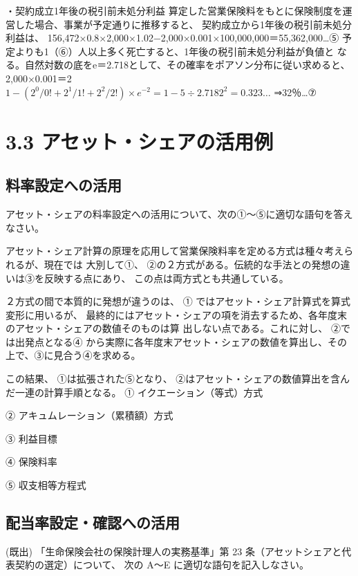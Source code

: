 \documentclass[report,gutter=10mm,fore-edge=10mm,uplatex,dvipdfmx]{jlreq}
\begin{document}
・契約成立1年後の税引前未処分利益
算定した営業保険料をもとに保険制度を運営した場合、事業が予定通りに推移すると、
契約成立から1年後の税引前未処分利益は、
156,472×0.8×2,000×1.02−2,000×0.001×100,000,000＝55,362,000…⑤
予定よりも1（⑥）人以上多く死亡すると、1年後の税引前未処分利益が負値と
なる。自然対数の底をe＝2.718として、その確率をポアソン分布に従い求めると、\\
2,000×0.001＝2\\
$1-(2^0/0!+2^1/1!+2^2/2!)×e^{−2}=1−5\div2.7182^2=0.323…$
⇒32％…⑦
\section{3.3 アセット・シェアの活用例}
\subsection{料率設定への活用}
アセット・シェアの料率設定への活用について、次の①～⑤に適切な語句を答えなさい。

アセット・シェア計算の原理を応用して営業保険料率を定める方式は種々考えられるが、現在では
大別して①、 ②の２方式がある。伝統的な手法との発想の違いは③を反映する点にあり、
この点は両方式とも共通している。

２方式の間で本質的に発想が違うのは、 ①
ではアセット・シェア計算式を算式変形に用いるが、
最終的にはアセット・シェアの項を消去するため、各年度末のアセット・シェアの数値そのものは算
出しない点である。これに対し、 ②では出発点となる④
から実際に各年度末アセット・シェアの数値を算出し、その上で、③に見合う④を求める。

この結果、 ①は拡張された⑤となり、 ②はアセット・シェアの数値算出を含んだ一連の計算手順となる。
\answer{}
① イクエーション（等式）方式\par
② アキュムレーション（累積額）方式\par
③ 利益目標\par
④ 保険料率\par
⑤ 収支相等方程式\par

\subsection{配当率設定・確認への活用}
 (既出)
「生命保険会社の保険計理人の実務基準」第 23 条（アセットシェアと代表契約の選定）について、
次の A～E に適切な語句を記入しなさい。
\end{document}
